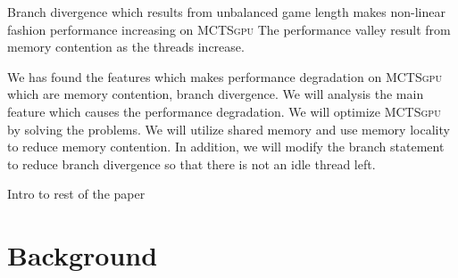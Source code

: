 \documentclass[conference]{IEEEtran}
\newcommand{\gpu} {\textsc{MCTSgpu} }
\begin{document}
Branch divergence which results from unbalanced game length makes non-linear fashion performance increasing on \gpu
The performance valley result from memory contention as the threads increase. 

We has found the features which makes performance degradation on \gpu which are memory contention, branch divergence.
We will analysis the main feature which causes the performance degradation.
We will optimize \gpu by solving the problems.
We will utilize shared memory and use memory locality to reduce memory contention.
In addition, we will modify the branch statement to reduce branch divergence so that there is not an idle thread left.



Intro to rest of the paper


 
\section{Background}
\end{document}
